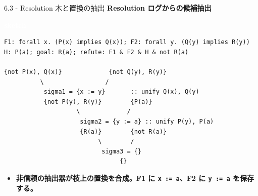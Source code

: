 \documentclass[dvipdfmx,aspectratio=169,11pt]{beamer}
\newcommand{\statusbadge}[2]{\colorbox{#1}{\textcolor{white}{\strut\scriptsize\sffamily\bfseries #2}}}
\newcommand{\badgeSketch}{\statusbadge{orange!75!black}{sketch}}
\begin{document}
\begin{frame}[fragile,t]{6.3 - Resolution 木と置換の抽出}
\smallskip
\textbf{Resolution ログからの候補抽出}~\badgeSketch
\begin{lstlisting}[language={},basicstyle=\ttfamily\footnotesize]
F1: forall x. (P(x) implies Q(x)); F2: forall y. (Q(y) implies R(y))
H: P(a); goal: R(a); refute: F1 & F2 & H & not R(a)

{not P(x), Q(x)}             {not Q(y), R(y)}
          \                 /
           sigma1 = {x := y}       :: unify Q(x), Q(y)
           {not P(y), R(y)}        {P(a)}
                    \             /
                     sigma2 = {y := a} :: unify P(y), P(a)
                     {R(a)}        {not R(a)}
                          \        /
                           sigma3 = {}
                                {}
\end{lstlisting}
\begin{itemize}
\setlength{\itemsep}{1pt}
\setlength{\parsep}{0pt}
\setlength{\parskip}{0pt}
\item \textcolor{blue!55!black}{\textbf{非信頼の抽出器が枝上の置換を合成。F1 に \texttt{x := a}、F2 に \texttt{y := a} を保存する。}}
\end{itemize}
\end{frame}
\end{document}
